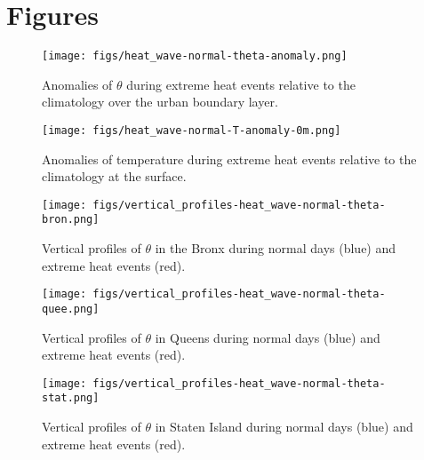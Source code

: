 \documentclass[num-refs]{wiley-article}
\begin{document}
\printendnotes

\printbibliography

\section*{Figures}




\begin{figure}[ht]
	\centering
	\texttt{[image: figs/heat\_wave-normal-theta-anomaly.png]}
	\caption{Anomalies of $\theta$ during extreme heat events relative to the climatology over the urban boundary layer.}
	\label{fig:extreme-heat-normal-comparison-contours-theta}
\end{figure}
\begin{figure}[ht]
	\centering
	\texttt{[image: figs/heat\_wave-normal-T-anomaly-0m.png]}
	\caption{Anomalies of temperature during extreme heat events relative to the climatology at the surface.}
	\label{fig:extreme_heat_normal_0m_comparison_T}
\end{figure}
\begin{figure}[ht]
	\centering
	\texttt{[image: figs/vertical\_profiles-heat\_wave-normal-theta-bron.png]}
	\caption{Vertical profiles of $\theta$ in the Bronx during normal days (blue) and extreme heat events (red).}
	\label{fig:vertical_profiles-heat_wave-normal-theta-bron}
\end{figure}
\begin{figure}[ht]
	\centering
	\texttt{[image: figs/vertical\_profiles-heat\_wave-normal-theta-quee.png]}
	\caption{Vertical profiles of $\theta$ in Queens during normal days (blue) and extreme heat events (red).}
	\label{fig:vertical_profiles-heat_wave-normal-theta-quee}
\end{figure}
\begin{figure}[ht]
	\centering
	\texttt{[image: figs/vertical\_profiles-heat\_wave-normal-theta-stat.png]}
	\caption{Vertical profiles of $\theta$ in Staten Island during normal days (blue) and extreme heat events (red).}
	\label{fig:vertical_profiles-heat_wave-normal-theta-stat}
\end{figure}
\end{document}
